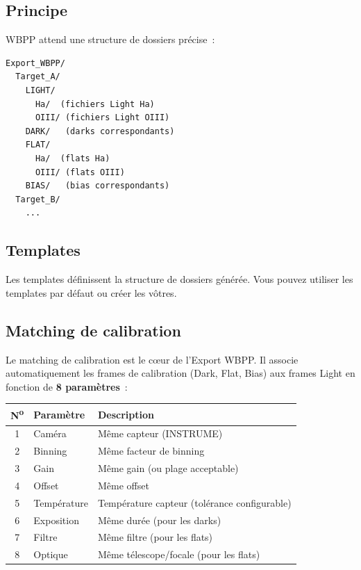 \documentclass[a4paper,11pt]{article}
\begin{document}
\subsection{Principe}

WBPP attend une structure de dossiers pr\'{e}cise~:

\begin{lstlisting}[title=Structure WBPP typique]
Export_WBPP/
  Target_A/
    LIGHT/
      Ha/  (fichiers Light Ha)
      OIII/ (fichiers Light OIII)
    DARK/   (darks correspondants)
    FLAT/
      Ha/  (flats Ha)
      OIII/ (flats OIII)
    BIAS/   (bias correspondants)
  Target_B/
    ...
\end{lstlisting}

\subsection{Templates}

Les templates d\'{e}finissent la structure de dossiers g\'{e}n\'{e}r\'{e}e. Vous pouvez utiliser les templates par d\'{e}faut ou cr\'{e}er les v\^{o}tres.

\subsection{Matching de calibration}

Le matching de calibration est le c\oe{}ur de l'Export WBPP. Il associe automatiquement les frames de calibration (Dark, Flat, Bias) aux frames Light en fonction de \textbf{8 param\`{e}tres}~:

\begin{center}
\begin{tabularx}{\textwidth}{c l X}
\toprule
\textbf{N\textsuperscript{o}} & \textbf{Param\`{e}tre} & \textbf{Description} \\
\midrule
1 & Cam\'{e}ra & M\^{e}me capteur (INSTRUME) \\
2 & Binning & M\^{e}me facteur de binning \\
3 & Gain & M\^{e}me gain (ou plage acceptable) \\
4 & Offset & M\^{e}me offset \\
5 & Temp\'{e}rature & Temp\'{e}rature capteur (tol\'{e}rance configurable) \\
6 & Exposition & M\^{e}me dur\'{e}e (pour les darks) \\
7 & Filtre & M\^{e}me filtre (pour les flats) \\
8 & Optique & M\^{e}me t\'{e}lescope/focale (pour les flats) \\
\bottomrule
\end{tabularx}
\end{center}
\end{document}
